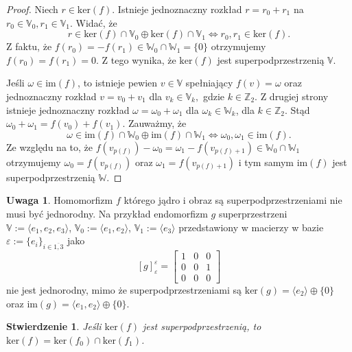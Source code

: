 \documentclass[11pt,a4paper]{report}
\newtheorem{proposition}[theorem]{Stwierdzenie}
\theoremstyle{definition}
\newtheorem{remark}[theorem]{Uwaga}
\newcommand{\eps}{\varepsilon}
\begin{document}
\begin{proof}
	Niech $r \in \textrm{ker}(f)$. Istnieje jednoznaczny rozkład $r = r_0 + r_1$ na $r_0 \in \mathbb{V}_0, r_1 \in \mathbb{V}_1$. Widać, że
	$$r \in\textrm{ker}(f) \cap \mathbb{V}_0 \oplus \textrm{ker}(f) \cap \mathbb{V}_1 \iff r_0, r_1 \in \textrm{ker}(f).$$
	Z faktu, że $f(r_0) = -f(r_1) \in \mathbb{W}_0\cap \mathbb{W}_1 = \{ 0 \}$ otrzymujemy $f(r_0) = f(r_1) = 0$. Z tego wynika, że $\textrm{ker}(f)$ jest superpodprzestrzenią  $\mathbb{V}$.
				 
	Jeśli $\omega \in \textrm{im}(f)$, to istnieje pewien $v \in \mathbb{V}$ spełniający $f(v) = \omega$ oraz jednoznaczny rozkład $v = v_0 + v_1$ dla $v_k \in \mathbb{V}_k,$ gdzie $k \in \mathbb{Z}_2$. Z drugiej strony istnieje jednoznaczny rozkład $\omega = \omega_0+\omega_1$ dla $\omega_k \in \mathbb{W}_k$, dla $k \in \mathbb{Z}_2$. Stąd $\omega_0 + \omega_1 = f(v_0) + f(v_1)$. Zauważmy, że
	$$\omega \in\textrm{im}(f) \cap \mathbb{W}_0 \oplus \textrm{im}(f) \cap \mathbb{W}_1 \iff \omega_0, \omega_1 \in \textrm{im}(f).$$
	Ze względu na to, że $f(v_{p(f)}) - \omega_0 = \omega_1 - f(v_{p(f)+1}) \in \mathbb{W}_0 \cap \mathbb{W}_1$ otrzymujemy $\omega_0 = f(v_{p(f)})$ oraz $\omega_1 = f(v_{p(f)+1})$ i tym samym $\mathrm{im}(f)$ jest superpodprzestrzenią $\mathbb{W}$.
\end{proof}

\begin{remark}
	Homomorfizm $f$ którego jądro i obraz są superpodprzestrzeniami nie musi być jednorodny. Na przykład endomorfizm $g$ superprzestrzeni $\mathbb{V} := \langle e_1, e_2, e_3 \rangle$, $\mathbb{V}_0 := \langle e_1, e_2 \rangle$, $\mathbb{V}_1 := \langle e_3 \rangle$ przedstawiony w macierzy w bazie $\eps:=\{ e_i \}_{i \in \overline{1,3}}$ jako 
	$$[g]^\eps_\eps = \begin{bmatrix}
	1 & 0 & 0 \\
	0 & 0 & 1 \\
	0 & 0 & 0 
	\end{bmatrix}$$
	nie jest jednorodny, mimo że superpodprzestrzeniami są $\textrm{ker}(g) = \langle e_2\rangle \oplus \{ 0 \}$ oraz $\textrm{im}(g) = \langle e_1, e_2 \rangle \oplus \{ 0 \}.$
\end{remark}

\begin{proposition}
	Jeśli $\mathrm{ker}(f)$ jest superpodprzestrzenią, to $\mathrm{ker}(f) = \mathrm{ker}(f_0) \cap \mathrm{ker}(f_1)$.
\end{proposition}
\end{document}
